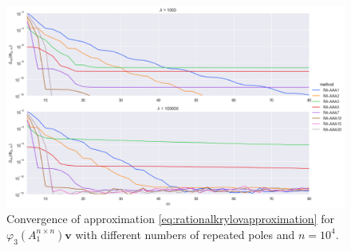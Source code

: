 \begin{figure}[H]
    \centering
    \includegraphics[width=.9\textwidth]{img/krylovapproximation/cnvg_poles_n1e04_p03.png}
    \caption{
        Convergence of approximation \eqref{eq:rationalkrylovapproximation}
        for $\varphi_3(A_1^{n \times n})\mathbf{v}$ with different numbers of repeated poles and $n=10^4$.
    }
    \label{fig:rationalkrylovpoleselection}
\end{figure}

